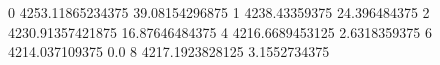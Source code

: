 0 4253.11865234375 39.08154296875
1 4238.43359375 24.396484375
2 4230.91357421875 16.87646484375
4 4216.6689453125 2.6318359375
6 4214.037109375 0.0
8 4217.1923828125 3.1552734375
